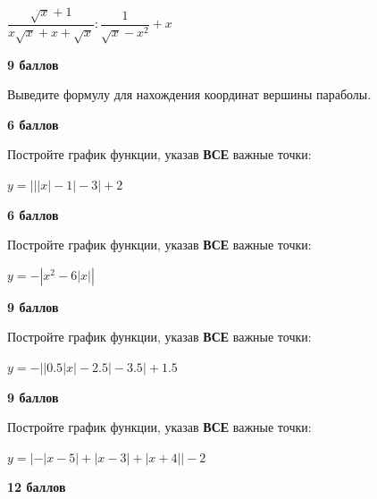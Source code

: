$\dfrac{\sqrt{x}+1}{x \sqrt{x}+x+\sqrt{x}}: \dfrac{1}{\sqrt{x}-x^2}+x$

\begin{flushright} \textbf{9 баллов}\\ 
\end{flushright}

\hspace{3mm}

\hspace{1mm}

 Выведите формулу для нахождения координат вершины параболы.

\begin{flushright} \textbf{6 баллов}\\ 
\end{flushright}

 Постройте график функции, указав \textbf{ВСЕ} важные точки:

$y=\left|\left|\left|x\right|-1\right|-3\right|+2$

\begin{flushright} \textbf{6 баллов}\\ 
\end{flushright}

 Постройте график функции, указав \textbf{ВСЕ} важные точки:

$y=-\left|x^{2}-6\left|x\right|\right|$

\begin{flushright} \textbf{9 баллов}\\ 
\end{flushright}

 Постройте график функции, указав \textbf{ВСЕ} важные точки:

$y=-\left|\left|0.5\left|x\right|-2.5\right|-3.5\right|+1.5$

\begin{flushright} \textbf{9 баллов}\\ 
\end{flushright}


 Постройте график функции, указав \textbf{ВСЕ} важные точки:

$y=\left|-\left|x-5\right|+\left|x-3\right|+\left|x+4\right|\right|-2$

\begin{flushright} \textbf{12 баллов}\\ 
\end{flushright}

